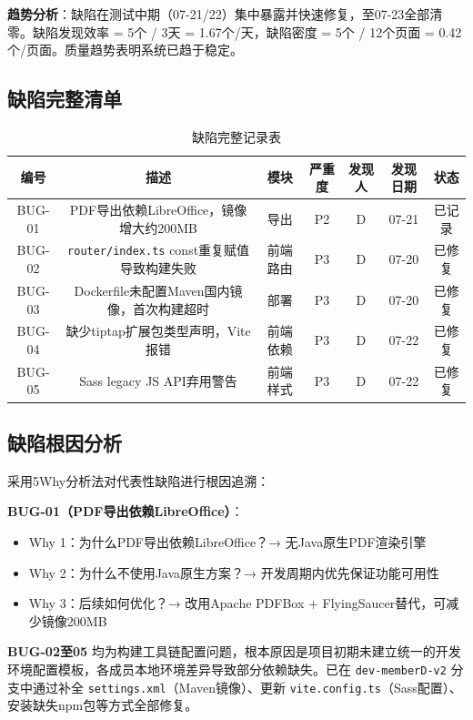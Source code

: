 \textbf{趋势分析}：缺陷在测试中期（07-21/22）集中暴露并快速修复，至07-23全部清零。缺陷发现效率 = 5个 / 3天 = 1.67个/天，缺陷密度 = 5个 / 12个页面 = 0.42个/页面。质量趋势表明系统已趋于稳定。

\subsection{缺陷完整清单}

\begin{table}[htbp]
    \centering
    \caption{缺陷完整记录表}
    \begin{tabular}{|c|c|c|c|c|c|c|}
        \hline
        \textbf{编号} & \textbf{描述} & \textbf{模块} & \textbf{严重度} & \textbf{发现人} & \textbf{发现日期} & \textbf{状态} \\
        \hline
        BUG-01 & PDF导出依赖LibreOffice，镜像增大约200MB & 导出 & P2 & D & 07-21 & 已记录 \\
        \hline
        BUG-02 & \texttt{router/index.ts} const重复赋值导致构建失败 & 前端路由 & P3 & D & 07-20 & 已修复 \\
        \hline
        BUG-03 & Dockerfile未配置Maven国内镜像，首次构建超时 & 部署 & P3 & D & 07-20 & 已修复 \\
        \hline
        BUG-04 & 缺少tiptap扩展包类型声明，Vite报错 & 前端依赖 & P3 & D & 07-22 & 已修复 \\
        \hline
        BUG-05 & Sass legacy JS API弃用警告 & 前端样式 & P3 & D & 07-22 & 已修复 \\
        \hline
    \end{tabular}
\end{table}

\subsection{缺陷根因分析}

采用5Why分析法对代表性缺陷进行根因追溯：

\textbf{BUG-01（PDF导出依赖LibreOffice）}：
\begin{itemize}
    \item Why 1：为什么PDF导出依赖LibreOffice？→ 无Java原生PDF渲染引擎
    \item Why 2：为什么不使用Java原生方案？→ 开发周期内优先保证功能可用性
    \item Why 3：后续如何优化？→ 改用Apache PDFBox + FlyingSaucer替代，可减少镜像200MB
\end{itemize}

\textbf{BUG-02至05} 均为构建工具链配置问题，根本原因是项目初期未建立统一的开发环境配置模板，各成员本地环境差异导致部分依赖缺失。已在 \texttt{dev-memberD-v2} 分支中通过补全 \texttt{settings.xml}（Maven镜像）、更新 \texttt{vite.config.ts}（Sass配置）、安装缺失npm包等方式全部修复。

